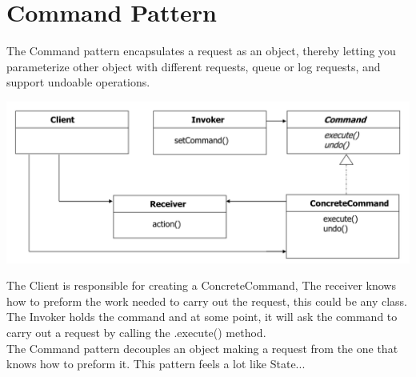 \documentclass{report}
\begin{document}
	\chapter{Command Pattern}
		The Command pattern encapsulates a request as an object, thereby letting you parameterize other object with different requests, queue or log requests, and support undoable operations. 
   		\begin{center}
   			\includegraphics[scale=0.4]{command}
   		\end{center} 
   		The Client is responsible for creating a ConcreteCommand, The receiver knows how to preform the work needed to carry out the request, this could be any class. The Invoker holds the command and at some point, it will ask the command to carry out a request by calling the .execute() method.
   		\\
   		The Command pattern decouples an object making a request from the one that knows how to preform it. This pattern feels a lot like State...
\end{document}
